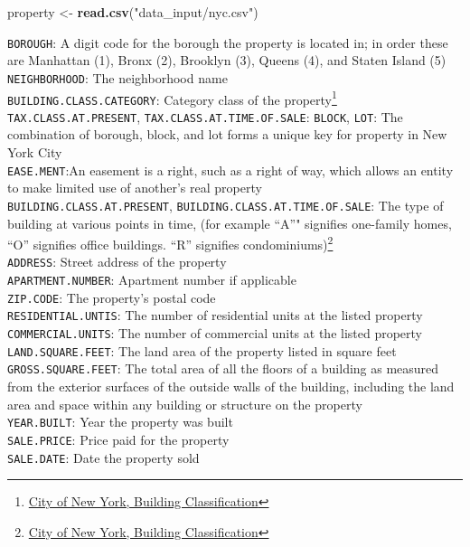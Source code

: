\documentclass[]{article}
\newenvironment{Shaded}{\begin{snugshade}}{\end{snugshade}}
\newcommand{\KeywordTok}[1]{\textcolor[rgb]{0.13,0.29,0.53}{\textbf{#1}}}
\newcommand{\NormalTok}[1]{#1}
\newcommand{\StringTok}[1]{\textcolor[rgb]{0.31,0.60,0.02}{#1}}
\begin{document}
\begin{Shaded}
\begin{Highlighting}[]
\NormalTok{property <-}\StringTok{ }\KeywordTok{read.csv}\NormalTok{(}\StringTok{"data_input/nyc.csv"}\NormalTok{)}
\end{Highlighting}
\end{Shaded}

\texttt{BOROUGH}: A digit code for the borough the property is located
in; in order these are Manhattan (1), Bronx (2), Brooklyn (3), Queens
(4), and Staten Island (5)\\
\texttt{NEIGHBORHOOD}: The neighborhood name\\
\texttt{BUILDING.CLASS.CATEGORY}: Category class of the
property\footnote{\href{http://www1.nyc.gov/assets/finance/jump/hlpbldgcode.html}{City
  of New York, Building Classification}}\\
\texttt{TAX.CLASS.AT.PRESENT}, \texttt{TAX.CLASS.AT.TIME.OF.SALE}:
\texttt{BLOCK}, \texttt{LOT}: The combination of borough, block, and lot
forms a unique key for property in New York City\\
\texttt{EASE.MENT}:An easement is a right, such as a right of way, which
allows an entity to make limited use of another's real property\\
\texttt{BUILDING.CLASS.AT.PRESENT},
\texttt{BUILDING.CLASS.AT.TIME.OF.SALE}: The type of building at various
points in time, (for example ``A''" signifies one-family homes, ``O''
signifies office buildings. ``R'' signifies condominiums)\footnote{\href{http://www1.nyc.gov/assets/finance/jump/hlpbldgcode.html}{City
  of New York, Building Classification}}\\
\texttt{ADDRESS}: Street address of the property\\
\texttt{APARTMENT.NUMBER}: Apartment number if applicable\\
\texttt{ZIP.CODE}: The property's postal code\\
\texttt{RESIDENTIAL.UNTIS}: The number of residential units at the
listed property\\
\texttt{COMMERCIAL.UNITS}: The number of commercial units at the listed
property\\
\texttt{LAND.SQUARE.FEET}: The land area of the property listed in
square feet\\
\texttt{GROSS.SQUARE.FEET}: The total area of all the floors of a
building as measured from the exterior surfaces of the outside walls of
the building, including the land area and space within any building or
structure on the property\\
\texttt{YEAR.BUILT}: Year the property was built\\
\texttt{SALE.PRICE}: Price paid for the property\\
\texttt{SALE.DATE}: Date the property sold
\end{document}
